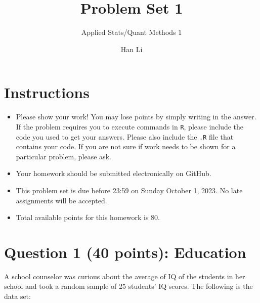 \documentclass[12pt,letterpaper]{article}
\title{Problem Set 1}
\date{Han Li}
\author{Applied Stats/Quant Methods 1}
\begin{document}
	\maketitle
	
	\section*{Instructions}
	\begin{itemize}
	\item Please show your work! You may lose points by simply writing in the answer. If the problem requires you to execute commands in \texttt{R}, please include the code you used to get your answers. Please also include the \texttt{.R} file that contains your code. If you are not sure if work needs to be shown for a particular problem, please ask.
\item Your homework should be submitted electronically on GitHub.
\item This problem set is due before 23:59 on Sunday October 1, 2023. No late assignments will be accepted.
\item Total available points for this homework is 80.
	\end{itemize}
	
	\vspace{1cm}
	\section*{Question 1 (40 points): Education}

A school counselor was curious about the average of IQ of the students in her school and took a random sample of 25 students' IQ scores. The following is the data set:\\
\vspace{.5cm}

  

\vspace{1cm}
\end{document}
